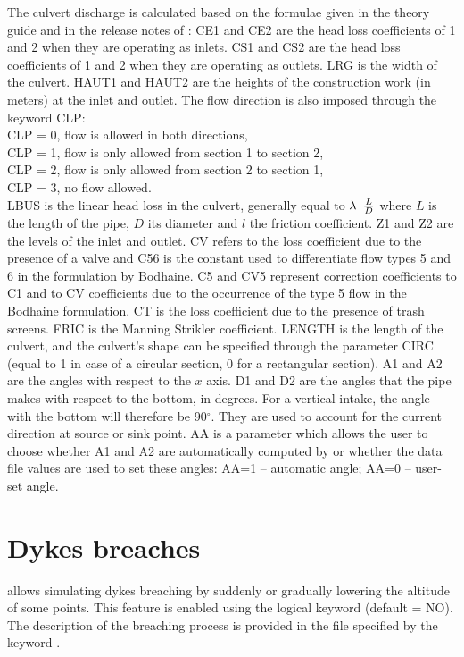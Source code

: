 The culvert discharge is calculated based on the formulae given
in the  theory guide and in the release notes of :
CE1 and CE2 are the head loss coefficients of 1 and 2 when they are operating as
inlets.
CS1 and CS2 are the head loss coefficients of 1 and 2 when they are operating as
outlets.
LRG is the width of the culvert.
HAUT1 and HAUT2 are the heights of the construction work (in meters)
at the inlet and outlet.
The flow direction is also imposed through the keyword CLP:\\
CLP = 0, flow is allowed in both directions,\\
CLP = 1, flow is only allowed from section 1 to section 2,\\
CLP = 2, flow is only allowed from section 2 to section 1,\\
CLP = 3, no flow allowed.\\
LBUS is the linear head loss in the culvert, generally equal to
$\lambda {\kern 1pt} {\kern 1pt} {\kern 1pt} {\kern 1pt} {\kern 1pt} \frac{L}{D} $
where $L$ is the length of the pipe, $D$ its diameter and $l$ the friction
coefficient.
Z1 and Z2 are the levels of the inlet and outlet.
CV refers to the loss coefficient due to the presence of a valve and
C56 is the constant used to differentiate flow types 5 and 6 in the formulation
by Bodhaine.
C5 and CV5 represent correction coefficients to C1 and to CV coefficients 
due to the occurrence of the type 5 flow in the Bodhaine formulation.
CT is the loss coefficient due to the presence of trash screens.
FRIC is the Manning Strikler coefficient.
LENGTH is the length of the culvert, and the culvert's shape can be specified
through the parameter CIRC (equal to 1 in 
case of a circular section, 0 for a rectangular section).
A1 and A2 are the angles with respect to the $x$ axis. 
D1 and D2 are the angles that the pipe makes with respect to the bottom,
in degrees.
For a vertical intake, the angle with the bottom will therefore be 90$^\circ$.
They are used to account for the current direction at source or sink point.
AA is a parameter which allows the user to choose whether A1 and A2 are
automatically computed by 
or whether the data file values are used to set these angles:
AA=1 -- automatic angle; AA=0 -- user-set angle.


\section{Dykes breaches}
\label{sec:dykes}
 allows simulating dykes breaching by suddenly or gradually
lowering the altitude of some points.
This feature is enabled using the logical keyword  (default = NO).
The description of the breaching process is provided in the file specified
by the keyword .

